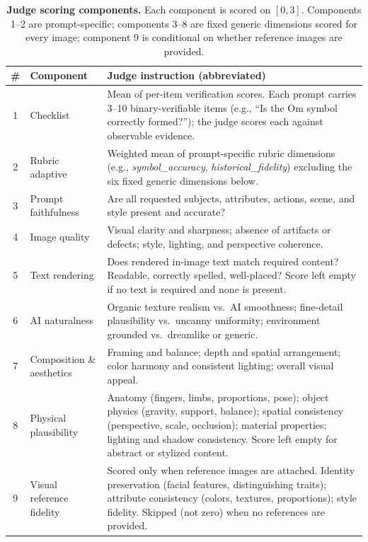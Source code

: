 \begin{table}[h]
\centering
\caption{\textbf{Judge scoring components.} Each component is scored on $[0,3]$. Components 1--2 are prompt-specific; components 3--8 are fixed generic dimensions scored for every image; component 9 is conditional on whether reference images are provided.}
\label{tab:judge_components}
\small
\renewcommand{\arraystretch}{1.25}
\begin{tabularx}{\linewidth}{@{}clX@{}}
\toprule
\textbf{\#} & \textbf{Component} & \textbf{Judge instruction (abbreviated)} \\
\midrule
1 & Checklist & Mean of per-item verification scores. Each prompt carries 3--10 binary-verifiable items (e.g., ``Is the Om symbol correctly formed?''); the judge scores each against observable evidence. \\
2 & Rubric adaptive & Weighted mean of prompt-specific rubric dimensions (e.g., \emph{symbol\_accuracy}, \emph{historical\_fidelity}) excluding the six fixed generic dimensions below. \\
\midrule
3 & Prompt faithfulness & Are all requested subjects, attributes, actions, scene, and style present and accurate? \\
4 & Image quality & Visual clarity and sharpness; absence of artifacts or defects; style, lighting, and perspective coherence. \\
5 & Text rendering & Does rendered in-image text match required content? Readable, correctly spelled, well-placed? Score left empty if no text is required and none is present. \\
6 & AI naturalness & Organic texture realism vs.\ AI smoothness; fine-detail plausibility vs.\ uncanny uniformity; environment grounded vs.\ dreamlike or generic. \\
7 & Composition \& aesthetics & Framing and balance; depth and spatial arrangement; color harmony and consistent lighting; overall visual appeal. \\
8 & Physical plausibility & Anatomy (fingers, limbs, proportions, pose); object physics (gravity, support, balance); spatial consistency (perspective, scale, occlusion); material properties; lighting and shadow consistency. Score left empty for abstract or stylized content. \\
\midrule
9 & Visual reference fidelity & Scored only when reference images are attached. Identity preservation (facial features, distinguishing traits); attribute consistency (colors, textures, proportions); style fidelity. Skipped (not zero) when no references are provided. \\
\bottomrule
\end{tabularx}
\end{table}

